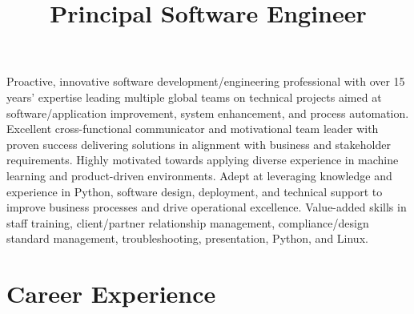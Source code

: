 \documentclass[10pt,a4paper,sans]{moderncv}
\title{Principal Software Engineer}
\begin{document}
\maketitle
Proactive, innovative software development/engineering
professional with over 15 years’ expertise leading multiple global teams on
technical projects aimed at software/application improvement, system
enhancement, and process automation. Excellent cross-functional communicator
and motivational team leader with proven success delivering solutions in
alignment with business and stakeholder requirements. Highly motivated towards
applying diverse experience in machine learning and product-driven
environments. Adept at leveraging knowledge and experience in Python, software
design, deployment, and technical support to improve business processes and
drive operational excellence. Value-added skills in staff training,
client/partner relationship management, compliance/design standard management,
troubleshooting, presentation, Python, and Linux.

\section{Career Experience}

\end{document}
